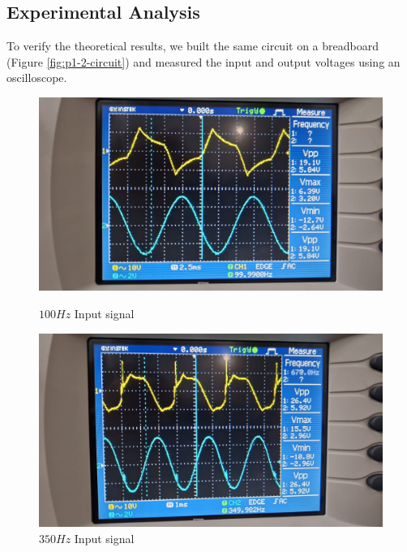 \newpage
\thispagestyle{plain}

\subsection{Experimental Analysis}
To verify the theoretical results, we built the same circuit on a breadboard (Figure \ref{fig:p1-2-circuit}) and measured the input and output voltages using an oscilloscope.

\begin{figure}[h]
    \centering
    \begin{minipage}{.4\textwidth}
        \includegraphics[width=1\linewidth]{assets/p2-exp-100.png}
        \caption{$100Hz$ Input signal}
        \label{fig:p2-exp-100}
    \end{minipage}%
    \begin{minipage}{.4\textwidth}
        \includegraphics[width=1\linewidth]{assets/p2-exp-350.png}
        \caption{$350Hz$ Input signal}
        \label{fig:p2-exp-350}
    \end{minipage}
    \begin{minipage}{.4\textwidth}

\end{minipage}
\end{figure}
